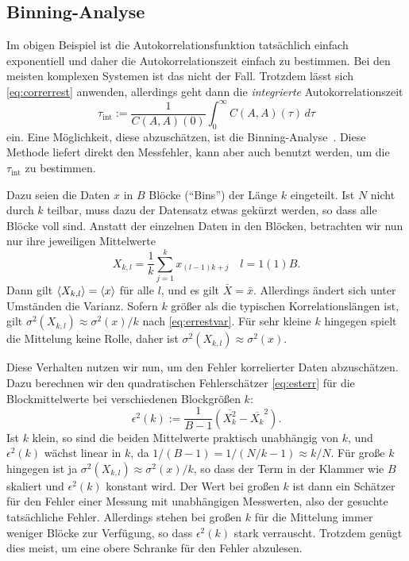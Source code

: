 \subsection{Binning-Analyse}

Im obigen Beispiel ist die Autokorrelationsfunktion tatsächlich
einfach exponentiell und daher die Autokorrelationszeit einfach zu
bestimmen. Bei den meisten komplexen Systemen ist das nicht der Fall.
Trotzdem lässt sich \eqref{eq:correrrest} anwenden, allerdings geht
dann die \emph{integrierte} Autokorrelationszeit
\begin{equation}
  \tau_\text{int} := \frac{1}{C(A,A)(0)}\int_0^\infty C(A,A)(\tau)\,d\tau
\end{equation}
ein. Eine Möglichkeit, diese abzuschätzen, ist die
Binning-Analyse~\cite{janke02a}. Diese Methode liefert direkt den
Messfehler, kann aber auch benutzt werden, um die $\tau_\text{int}$ zu
bestimmen.

Dazu seien die Daten $x$ in $B$ Blöcke (\enquote{Bins}) der Länge $k$
eingeteilt. Ist $N$ nicht durch $k$ teilbar, muss dazu der Datensatz
etwas gekürzt werden, so dass alle Blöcke voll sind. Anstatt der
einzelnen Daten in den Blöcken, betrachten wir nun nur ihre jeweiligen
Mittelwerte
\begin{equation}
  X_{k,l} = \frac{1}{k}\sum_{j=1}^{k}x_{(l-1)k + j}\quad l=1(1)B.
\end{equation}
Dann gilt $\left\langle{X_{k,l}}\right\rangle = \left\langle{x}\right\rangle$ für alle $l$, und es
gilt $\bar{X} = \bar{x}$. Allerdings ändert sich unter Umständen die
Varianz. Sofern $k$ größer als die typischen Korrelationslängen ist,
gilt $\sigma^2(X_{k,l}) \approx \sigma^2(x)/k$ nach
\eqref{eq:errestvar}. Für sehr kleine $k$ hingegen spielt die
Mittelung keine Rolle, daher ist $\sigma^2(X_{k,l}) \approx
\sigma^2(x)$.

Diese Verhalten nutzen wir nun, um den Fehler korrelierter Daten
abzuschätzen. Dazu berechnen wir den quadratischen Fehlerschätzer
\eqref{eq:esterr} für die Blockmittelwerte bei verschiedenen
Blockgrößen $k$:
\begin{equation}
  \epsilon^2(k) := \frac{1}{B - 1} \left(\overline{X_k^2} - \overline{X_k}^2\right).
\end{equation}
Ist $k$ klein, so sind die beiden Mittelwerte praktisch unabhängig von
$k$, und $\epsilon^2(k)$ wächst linear in $k$, da $1/(B-1) = 1/(N/k -
1)\approx k/N$. Für große $k$ hingegen ist ja $\sigma^2(X_{k,l})
\approx \sigma^2(x)/k$, so dass der Term in der Klammer wie $B$
skaliert und $\epsilon^2(k)$ konstant wird. Der Wert bei großen $k$ ist
dann ein Schätzer für den Fehler einer Messung mit unabhängigen
Messwerten, also der gesuchte tatsächliche Fehler.  Allerdings stehen
bei großen $k$ für die Mittelung immer weniger Blöcke zur Verfügung,
so dass $\epsilon^2(k)$ stark verrauscht. Trotzdem genügt dies meist, um
eine obere Schranke für den Fehler abzulesen.

